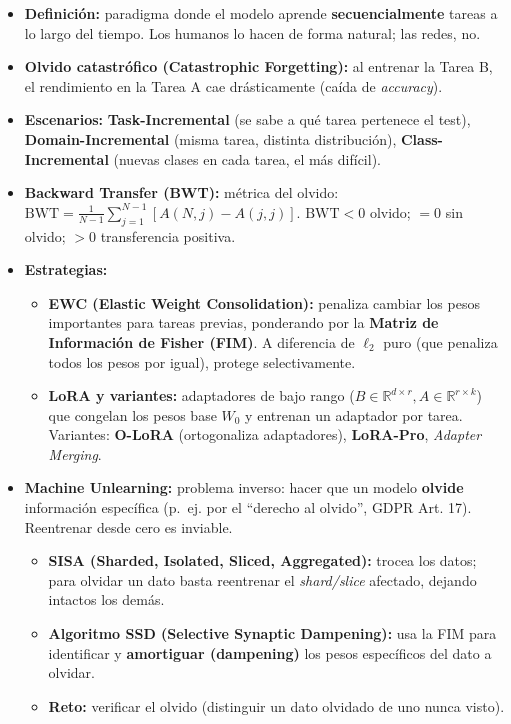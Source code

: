 \documentclass[12pt]{book} %
\providecommand{\tightlist}{%
  \setlength{\itemsep}{0pt}\setlength{\parskip}{0pt}}
\begin{document}
\begin{itemize}
\tightlist
\item
  \textbf{Definición:} paradigma donde el modelo aprende
  \textbf{secuencialmente} tareas a lo largo del tiempo. Los humanos lo
  hacen de forma natural; las redes, no.
\item
  \textbf{Olvido catastrófico (Catastrophic Forgetting):} al entrenar la
  Tarea B, el rendimiento en la Tarea A cae drásticamente (caída de
  \emph{accuracy}).
\item
  \textbf{Escenarios:} \textbf{Task-Incremental} (se sabe a qué tarea
  pertenece el test), \textbf{Domain-Incremental} (misma tarea, distinta
  distribución), \textbf{Class-Incremental} (nuevas clases en cada
  tarea, el más difícil).
\item
  \textbf{Backward Transfer (BWT):} métrica del olvido:
  \(\text{BWT} = \frac{1}{N-1}\sum_{j=1}^{N-1}[A(N,j) - A(j,j)]\).
  \(\text{BWT}<0\) olvido; \(=0\) sin olvido; \(>0\) transferencia
  positiva.
\item
  \textbf{Estrategias:}

  \begin{itemize}
  \tightlist
  \item
    \textbf{EWC (Elastic Weight Consolidation):} penaliza cambiar los
    pesos importantes para tareas previas, ponderando por la
    \textbf{Matriz de Información de Fisher (FIM)}. A diferencia de
    \(\ell_2\) puro (que penaliza todos los pesos por igual), protege
    selectivamente.
  \item
    \textbf{LoRA y variantes:} adaptadores de bajo rango
    (\(B\in\mathbb{R}^{d\times r}, A\in\mathbb{R}^{r\times k}\)) que
    congelan los pesos base \(W_0\) y entrenan un adaptador por tarea.
    Variantes: \textbf{O-LoRA} (ortogonaliza adaptadores),
    \textbf{LoRA-Pro}, \emph{Adapter Merging}.
  \end{itemize}
\item
  \textbf{Machine Unlearning:} problema inverso: hacer que un modelo
  \textbf{olvide} información específica (p.~ej. por el ``derecho al
  olvido'', GDPR Art. 17). Reentrenar desde cero es inviable.

  \begin{itemize}
  \tightlist
  \item
    \textbf{SISA (Sharded, Isolated, Sliced, Aggregated):} trocea los
    datos; para olvidar un dato basta reentrenar el \emph{shard/slice}
    afectado, dejando intactos los demás.
  \item
    \textbf{Algoritmo SSD (Selective Synaptic Dampening):} usa la FIM
    para identificar y \textbf{amortiguar (dampening)} los pesos
    específicos del dato a olvidar.
  \item
    \textbf{Reto:} verificar el olvido (distinguir un dato olvidado de
    uno nunca visto).
  \end{itemize}
\end{itemize}
\end{document}
